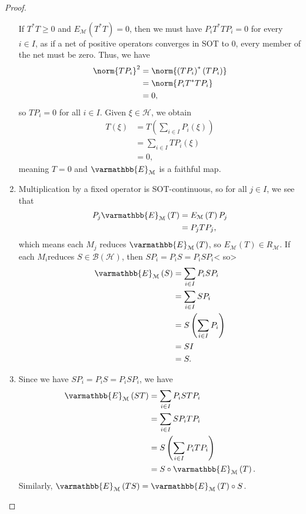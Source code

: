 \documentclass[10pt]{mypackage}
\renewcommand*{\mathbb}[1]{\varmathbb{#1}}
\begin{document}
\begin{proof}
\begin{enumerate}[(1)]
      If $T^{\ast}T \geq 0$ and $E_{\mathcal{M}}\left(T^{\ast}T\right) = 0$, then we must have $P_iT^{\ast}TP_i = 0$ for every $i\in I$, as if a net of positive operators converges in SOT to $0$, every member of the net must be zero. Thus, we have
      \begin{align*}
        \norm{TP_i}^2 &= \norm{\left(TP_i\right)^{\ast}\left(TP_i\right)}\\
                      &= \norm{P_iT^{\ast}TP_i}\\
                      &= 0,
      \end{align*}
      so $TP_i = 0$ for all $i\in I$. Given $\xi\in \mathcal{H}$, we obtain
      \begin{align*}
        T\left(\xi\right) &= T\left(\sum_{i\in I}P_i\left(\xi\right)\right)\\
                          &= \sum_{i\in I}TP_i\left(\xi\right)\\
                          &= 0,
      \end{align*}
      meaning $T = 0$ and $\mathbb{E}_{\mathcal{M}}$ is a faithful map.
    \item Multiplication by a fixed operator is SOT-continuous, so for all $j\in I$, we see that
      \begin{align*}
        P_j \mathbb{E}_{\mathcal{M}}\left(T\right) &= E_{\mathcal{M}}\left(T\right)P_{j}\\
                                                   &= P_jTP_j,
      \end{align*}
      which means each $M_j$ reduces $\mathbb{E}_{\mathcal{M}}\left(T\right)$, so $E_{\mathcal{M}}\left(T\right)\in R_{\mathcal{M}}$. If each $M_i$reduces $S\in \mathcal{B}\left(\mathcal{H}\right)$, then $SP_i = P_iS = P_iSP_i$< so>
      \begin{align*}
        \mathbb{E}_{\mathcal{M}}\left(S\right) &= \sum_{i\in I}P_iSP_i\\
                                               &= \sum_{i\in I}SP_i\\
                                               &= S\left(\sum_{i\in I}P_i\right)\\
                                               &= SI\\
                                               &= S.
      \end{align*}
    \item Since we have $SP_i = P_iS = P_iSP_i$, we have
      \begin{align*}
        \mathbb{E}_{\mathcal{M}}\left(ST\right) &= \sum_{i\in I}P_iSTP_i\\
                                                &= \sum_{i\in I}SP_iTP_i\\
                                                &= S\left(\sum_{i\in I}P_iTP_i\right)\\
                                                &= S\circ \mathbb{E}_{\mathcal{M}}\left(T\right).
      \end{align*}
      Similarly, $\mathbb{E}_{\mathcal{M}}\left(TS\right) = \mathbb{E}_{\mathcal{M}}\left(T\right) \circ S$.
  \end{enumerate}
\end{proof}
\end{document}

